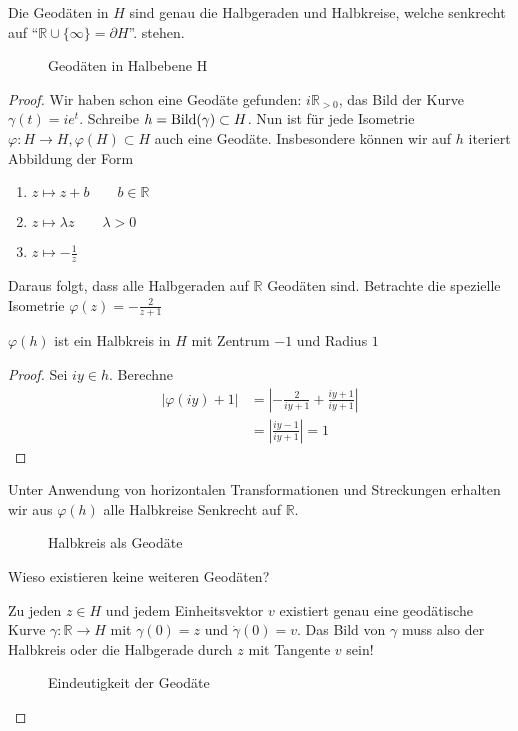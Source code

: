 \documentclass[../main.tex]{subfiles}
\begin{document}
\begin{proposition}
    Die Geodäten in $H$ sind genau die Halbgeraden und Halbkreise, welche senkrecht auf ``$\mathbb{R} \cup \{\infty \} = \partial H$''.
    stehen. 
\end{proposition}

\begin{figure}[htb]
    \centering
    \def\svgwidth{20em}
    
    \caption{Geodäten in Halbebene H}        
\end{figure}

\begin{proof}
    Wir haben schon eine Geodäte gefunden:
    $i \mathbb{R}_{>0} $, das Bild der Kurve $\gamma (t) = ie^t$.
    Schreibe $h = \operatorname{Bild} (\gamma) \subset H$. Nun ist für jede Isometrie
    $\varphi : H \to H, \varphi (H) \subset H$ auch eine Geodäte. Insbesondere
    können wir auf $h$ iteriert Abbildung der Form
    \begin{enumerate}
        \item $z \mapsto z + b \qquad b \in \mathbb{R}$
        \item $z \mapsto \lambda z \qquad \lambda > 0$
        \item $z \mapsto -\frac{1}{z}$
    \end{enumerate}
    Daraus folgt, dass alle Halbgeraden auf $\mathbb{R}$ Geodäten sind.
    Betrachte die spezielle Isometrie $\varphi (z)=-\frac{2}{z+1}$
    \begin{claim}
        $\varphi (h)$ ist ein Halbkreis in $H$ mit Zentrum $-1$ und Radius $1$
    \end{claim}
    \begin{proof}
        Sei $i y \in h$. Berechne
        \begin{align*}
            |\varphi(iy)+1| &= \left| -\frac{2}{iy+1} + \frac{iy+1}{iy+1} \right| \\
            &= \left| \frac{iy -1}{iy+1} \right| = 1
        \end{align*}
    \end{proof}
    Unter Anwendung von horizontalen Transformationen und Streckungen erhalten wir aus $\varphi(h)$
    alle Halbkreise Senkrecht auf $\mathbb{R}$.
    \begin{figure}[htb]
        \centering
        \def\svgwidth{20em}
        
        \caption{Halbkreis als Geodäte}        
    \end{figure}

    \begin{question}
        Wieso existieren keine weiteren Geodäten?
    \end{question}
    Zu jeden $z \in H$ und jedem Einheitsvektor $v$ existiert genau eine geodätische Kurve $\gamma : \mathbb{R} \to H$
    mit $\gamma (0) = z$ und $\dot{\gamma} (0) = v$. Das Bild von $\gamma$ muss also der Halbkreis
    oder die Halbgerade durch $z$ mit Tangente $v$ sein!
    \begin{figure}[htb]
        \centering
        \def\svgwidth{10em}
        
        \caption{Eindeutigkeit der Geodäte}        
    \end{figure}
\end{proof}
\end{document}
